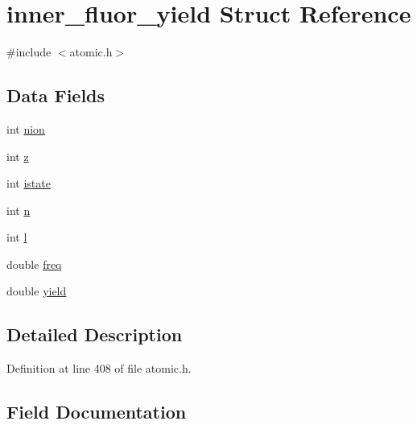 \hypertarget{structinner__fluor__yield}{}\section{inner\+\_\+fluor\+\_\+yield Struct Reference}
\label{structinner__fluor__yield}


{\ttfamily \#include $<$atomic.\+h$>$}

\subsection*{Data Fields}
\begin{DoxyCompactItemize}
\item 
int \hyperlink{structinner__fluor__yield_a45f9a62a5b21a4684a385d0652a3c0f6}{nion}
\item 
int \hyperlink{structinner__fluor__yield_a59d9eee82a286e387081c5e508114136}{z}
\item 
int \hyperlink{structinner__fluor__yield_a7325c8e87d6bb7bcca9440ded77a28e4}{istate}
\item 
int \hyperlink{structinner__fluor__yield_a64ede07da38d3947ea0a054692747ee0}{n}
\item 
int \hyperlink{structinner__fluor__yield_aaa4ed7b58ea52b19cf4cd6248f51c4e3}{l}
\item 
double \hyperlink{structinner__fluor__yield_a22d6caee9c3f9d0bab83344045af4c69}{freq}
\item 
double \hyperlink{structinner__fluor__yield_a0a0200c0d76196864d6288477fe71508}{yield}
\end{DoxyCompactItemize}


\subsection{Detailed Description}


Definition at line 408 of file atomic.\+h.



\subsection{Field Documentation}
\mbox{\label{structinner__fluor__yield_a22d6caee9c3f9d0bab83344045af4c69}} 
